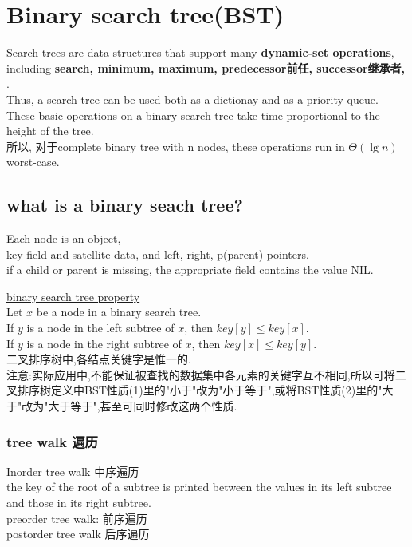 \documentclass{article}
\begin{document}
\section{Binary search tree(BST)}
Search trees are data structures that support many \textbf{dynamic-set operations}, including \textbf{search, minimum, maximum, predecessor前任, successor继承者, }.\\
Thus, a search tree can be used both as a dictionay and as a priority queue.\\
These basic operations on a binary search tree take time proportional to the height of the tree.\\
所以, 对于complete binary tree with n nodes, these operations run in $\Theta(\lg n)$ worst-case.

\subsection{what is a binary seach tree?}
Each node is an object, \\
key field and satellite data, and left, right, p(parent) pointers.\\
if a child or parent is missing, the appropriate field contains the value NIL.

\underline{binary search tree property}\\
Let $x$ be a node in a binary search tree.\\
If $y$ is a node in the left subtree of $x$, then $key[y] \leq key[x]$.\\
If $y$ is a node in the right subtree of $x$, then $key[x] \leq key[y]$.\\
二叉排序树中,各结点关键字是惟一的.\\
注意:实际应用中,不能保证被查找的数据集中各元素的关键字互不相同,所以可将二叉排序树定义中BST性质(1)里的"小于"改为"小于等于",或将BST性质(2)里的"大于"改为"大于等于",甚至可同时修改这两个性质.\\

\subsubsection{tree walk 遍历}
\noindent Inorder tree walk 中序遍历\\
the key of the root of a subtree is printed between the values in its left subtree and those in its right subtree.\\
preorder tree walk: 前序遍历\\
postorder tree walk  后序遍历
\end{document}
